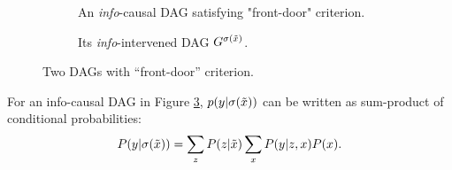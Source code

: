 	\begin{figure}[h]
		\begin{subfigure}[tb]{0.5\textwidth}
			\centering
			\caption{An \emph{info}-causal DAG satisfying "front-door" criterion.}
			\label{fig:front1}
		\end{subfigure}
		\hfill
		\begin{subfigure}[tb]{0.5\textwidth}
			\centering
			\caption{Its \emph{info}-intervened DAG $G^{\mathrm{\sigma}(\tilde{x})}$.}
			\label{fig:indep2}
		\end{subfigure}
		\caption{Two DAGs with ``front-door'' criterion.}
		\label{fig:front2}
	\end{figure}

 


\begin{Thm}
For an info-causal DAG in Figure \ref{fig:front2}, 
$p(y|\mathrm{\sigma}(\tilde{x}))$ can be written as sum-product of conditional probabilities:
	\begin{equation*}
	P(y|\mathrm{\sigma}(\tilde{x})) = \sum_z  P(z|\tilde{x}) \sum_x P(y|z, x) P(x).
	\end{equation*}
\end{Thm}

